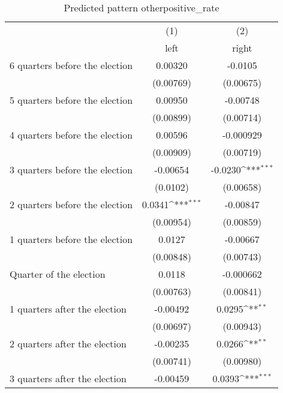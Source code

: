 \begin{table}[htbp]\centering
\def\sym#1{\ifmmode^{#1}\else\(^{#1}\)\fi}
\caption{Predicted pattern otherpositive\_rate}
\begin{tabular}{l*{2}{c}}
\hline\hline
                    &\multicolumn{1}{c}{(1)}&\multicolumn{1}{c}{(2)}\\
                    &\multicolumn{1}{c}{left}&\multicolumn{1}{c}{right}\\
\hline
 6 quarters before the election&     0.00320         &     -0.0105         \\
                    &   (0.00769)         &   (0.00675)         \\
[1em]
 5 quarters before the election&     0.00950         &    -0.00748         \\
                    &   (0.00899)         &   (0.00714)         \\
[1em]
 4 quarters before the election&     0.00596         &   -0.000929         \\
                    &   (0.00909)         &   (0.00719)         \\
[1em]
 3 quarters before the election&    -0.00654         &     -0.0230\sym{***}\\
                    &    (0.0102)         &   (0.00658)         \\
[1em]
 2 quarters before the election&      0.0341\sym{***}&    -0.00847         \\
                    &   (0.00954)         &   (0.00859)         \\
[1em]
 1 quarters before the election&      0.0127         &    -0.00667         \\
                    &   (0.00848)         &   (0.00743)         \\
[1em]
Quarter of the election&      0.0118         &   -0.000662         \\
                    &   (0.00763)         &   (0.00841)         \\
[1em]
 1 quarters after the election&    -0.00492         &      0.0295\sym{**} \\
                    &   (0.00697)         &   (0.00943)         \\
[1em]
 2 quarters after the election&    -0.00235         &      0.0266\sym{**} \\
                    &   (0.00741)         &   (0.00980)         \\
[1em]
 3 quarters after the election&    -0.00459         &      0.0393\sym{***}\\

\end{tabular}
\end{table}
